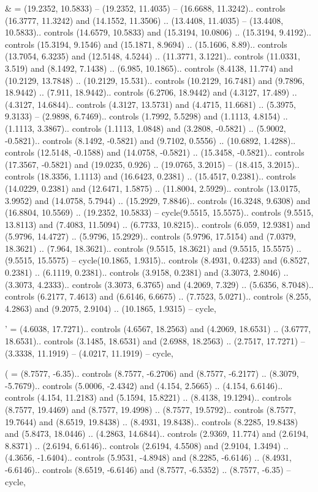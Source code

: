 & = {(19.2352, 10.5833) -- (19.2352, 11.4035) -- (16.6688, 11.3242).. controls (16.3777, 11.3242) and (14.1552, 11.3506) .. (13.4408, 11.4035) -- (13.4408, 10.5833).. controls (14.6579, 10.5833) and (15.3194, 10.0806) .. (15.3194, 9.4192).. controls (15.3194, 9.1546) and (15.1871, 8.9694) .. (15.1606, 8.89).. controls (13.7054, 6.3235) and (12.5148, 4.5244) .. (11.3771, 3.1221).. controls (11.0331, 3.519) and (8.1492, 7.1438) .. (6.985, 10.1865).. controls (8.4138, 11.774) and (10.2129, 13.7848) .. (10.2129, 15.531).. controls (10.2129, 16.7481) and (9.7896, 18.9442) .. (7.911, 18.9442).. controls (6.2706, 18.9442) and (4.3127, 17.489) .. (4.3127, 14.6844).. controls (4.3127, 13.5731) and (4.4715, 11.6681) .. (5.3975, 9.3133) -- (2.9898, 6.7469).. controls (1.7992, 5.5298) and (1.1113, 4.8154) .. (1.1113, 3.3867).. controls (1.1113, 1.0848) and (3.2808, -0.5821) .. (5.9002, -0.5821).. controls (8.1492, -0.5821) and (9.7102, 0.5556) .. (10.6892, 1.4288).. controls (12.5148, -0.1588) and (14.0758, -0.5821) .. (15.3458, -0.5821).. controls (17.3567, -0.5821) and (19.0235, 0.926) .. (19.0765, 3.2015) -- (18.415, 3.2015).. controls (18.3356, 1.1113) and (16.6423, 0.2381) .. (15.4517, 0.2381).. controls (14.0229, 0.2381) and (12.6471, 1.5875) .. (11.8004, 2.5929).. controls (13.0175, 3.9952) and (14.0758, 5.7944) .. (15.2929, 7.8846).. controls (16.3248, 9.6308) and (16.8804, 10.5569) .. (19.2352, 10.5833) -- cycle(9.5515, 15.5575).. controls (9.5515, 13.8113) and (7.4083, 11.5094) .. (6.7733, 10.8215).. controls (6.059, 12.9381) and (5.9796, 14.4727) .. (5.9796, 15.2929).. controls (5.9796, 17.5154) and (7.0379, 18.3621) .. (7.964, 18.3621).. controls (9.5515, 18.3621) and (9.5515, 15.5575) .. (9.5515, 15.5575) -- cycle(10.1865, 1.9315).. controls (8.4931, 0.4233) and (6.8527, 0.2381) .. (6.1119, 0.2381).. controls (3.9158, 0.2381) and (3.3073, 2.8046) .. (3.3073, 4.2333).. controls (3.3073, 6.3765) and (4.2069, 7.329) .. (5.6356, 8.7048).. controls (6.2177, 7.4613) and (6.6146, 6.6675) .. (7.7523, 5.0271).. controls (8.255, 4.2863) and (9.2075, 2.9104) .. (10.1865, 1.9315) -- cycle},

' = {(4.6038, 17.7271).. controls (4.6567, 18.2563) and (4.2069, 18.6531) .. (3.6777, 18.6531).. controls (3.1485, 18.6531) and (2.6988, 18.2563) .. (2.7517, 17.7271) -- (3.3338, 11.1919) -- (4.0217, 11.1919) -- cycle},

( = {(8.7577, -6.35).. controls (8.7577, -6.2706) and (8.7577, -6.2177) .. (8.3079, -5.7679).. controls (5.0006, -2.4342) and (4.154, 2.5665) .. (4.154, 6.6146).. controls (4.154, 11.2183) and (5.1594, 15.8221) .. (8.4138, 19.1294).. controls (8.7577, 19.4469) and (8.7577, 19.4998) .. (8.7577, 19.5792).. controls (8.7577, 19.7644) and (8.6519, 19.8438) .. (8.4931, 19.8438).. controls (8.2285, 19.8438) and (5.8473, 18.0446) .. (4.2863, 14.6844).. controls (2.9369, 11.774) and (2.6194, 8.8371) .. (2.6194, 6.6146).. controls (2.6194, 4.5508) and (2.9104, 1.3494) .. (4.3656, -1.6404).. controls (5.9531, -4.8948) and (8.2285, -6.6146) .. (8.4931, -6.6146).. controls (8.6519, -6.6146) and (8.7577, -6.5352) .. (8.7577, -6.35) -- cycle},

